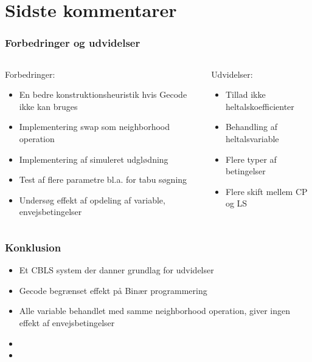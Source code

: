 \documentclass[smaller,handouts]{beamer}
\begin{document}
\section{Sidste kommentarer}
\begin{frame}
 \frametitle{Forbedringer og udvidelser}
 \begin{columns}[T]
  \begin{column}[T]{0.5\linewidth}
    Forbedringer:  \pause
    \begin{itemize}[<+->]
    \item En bedre konstruktionsheuristik hvis Gecode ikke kan bruges
     \item Implementering swap som neighborhood operation
     \item Implementering af simuleret udglødning
     \item Test af flere parametre bl.a. for tabu søgning
     \item Undersøg effekt af opdeling af variable, envejsbetingelser
    \end{itemize}
  \end{column}
\begin{column}[T]{0.5\linewidth}
  Udvidelser: \pause
   \begin{itemize}[<+->]
     \item Tillad ikke heltalskoefficienter 
     \item Behandling af heltalsvariable
     \item Flere typer af betingelser
     \item Flere skift mellem CP og LS
    \end{itemize}
  \end{column}

 \end{columns}

\end{frame}

\begin{frame}
 \frametitle{Konklusion}
    \begin{itemize}[<+->]
     \item Et CBLS system der danner grundlag for udvidelser
     \item Gecode begrænset effekt på Binær programmering
     \item Alle variable behandlet med samme neighborhood operation, giver ingen effekt af envejsbetingelser
     \item 
     \item 
    \end{itemize}
\end{frame}
\end{document}

